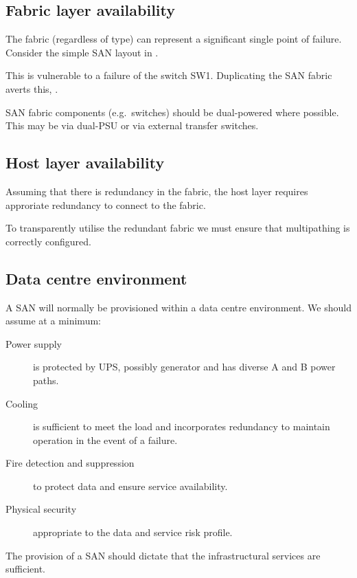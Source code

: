 \subsection{Fabric layer availability}
\label{sec:fabric-layer-availability}

The fabric (regardless of type) can represent a significant single point
of failure. Consider the simple SAN layout in .

This is vulnerable to a failure of the switch SW1. Duplicating the SAN
fabric averts this, .

SAN fabric components (e.g.~switches) should be dual-powered where
possible. This may be via dual-PSU or via external transfer switches.

\subsection{Host layer availability}
\label{sec:host-layer-availability}

Assuming that there is redundancy in the fabric, the host layer requires
approriate redundancy to connect to the fabric.

To transparently utilise the redundant fabric we must ensure that
multipathing is correctly configured.

\subsection{Data centre environment}
\label{sec:data-centre-environment}

A SAN will normally be provisioned within a data centre environment. We
should assume at a minimum:

\begin{description}
\item[Power supply]
is protected by UPS, possibly generator and has diverse A and B power
paths.
\item[Cooling]
is sufficient to meet the load and incorporates redundancy to maintain
operation in the event of a failure.
\item[Fire detection and suppression]
to protect data and ensure service availability.
\item[Physical security]
appropriate to the data and service risk profile.
\end{description}

The provision of a SAN should dictate that the infrastructural services
are sufficient.

